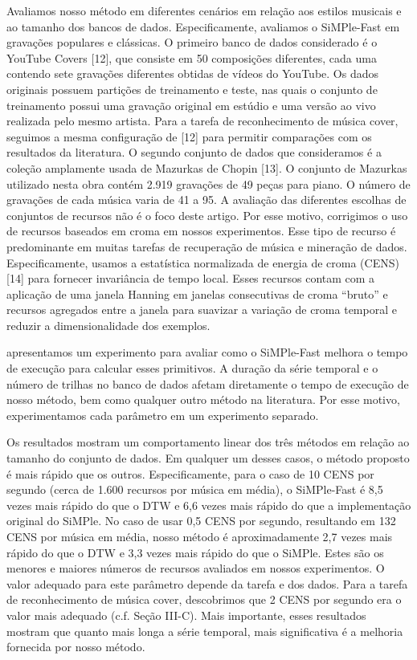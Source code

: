 \documentclass{article}
\begin{document}
Avaliamos nosso método em diferentes cenários em relação aos estilos musicais e ao tamanho dos bancos de dados. Especificamente, avaliamos o SiMPle-Fast em gravações populares e clássicas. O primeiro banco de dados considerado é o YouTube Covers [12], que consiste em 50 composições diferentes, cada uma contendo sete gravações diferentes obtidas de vídeos do YouTube. Os dados originais possuem partições de treinamento e teste, nas quais o conjunto de treinamento possui uma gravação original em estúdio e uma versão ao vivo realizada pelo mesmo artista. Para a tarefa de reconhecimento de música cover, seguimos a mesma configuração de [12] para permitir comparações com os resultados da literatura. O segundo conjunto de dados que consideramos é a coleção amplamente usada de Mazurkas de Chopin [13]. O conjunto de Mazurkas utilizado nesta obra contém 2.919 gravações de 49 peças para piano. O número de gravações de cada música varia de 41 a 95. A avaliação das diferentes escolhas de conjuntos de recursos não é o foco deste artigo. Por esse motivo, corrigimos o uso de recursos baseados em croma em nossos experimentos. Esse tipo de recurso é predominante em muitas tarefas de recuperação de música e mineração de dados. Especificamente, usamos a estatística normalizada de energia de croma (CENS) [14] para fornecer invariância de tempo local. Esses recursos contam com a aplicação de uma janela Hanning em janelas consecutivas de croma “bruto” e recursos agregados entre a janela para suavizar a variação de croma temporal e reduzir a dimensionalidade dos exemplos.

apresentamos um experimento para avaliar como o SiMPle-Fast melhora o tempo de execução para calcular esses primitivos. A duração da série temporal e o número de trilhas no banco de dados afetam diretamente o tempo de execução de nosso método, bem como qualquer outro método na literatura. Por esse motivo, experimentamos cada parâmetro em um experimento separado.

Os resultados mostram um comportamento linear dos três métodos em relação ao tamanho do conjunto de dados. Em qualquer um desses casos, o método proposto é mais rápido que os outros. Especificamente, para o caso de 10 CENS por segundo (cerca de 1.600 recursos por música em média), o SiMPle-Fast é 8,5 vezes mais rápido do que o DTW e 6,6 vezes mais rápido do que a implementação original do SiMPle. No caso de usar 0,5 CENS por segundo, resultando em 132 CENS por música em média, nosso método é aproximadamente 2,7 vezes mais rápido do que o DTW e 3,3 vezes mais rápido do que o SiMPle. Estes são os menores e maiores números de recursos avaliados em nossos experimentos. O valor adequado para este parâmetro depende da tarefa e dos dados. Para a tarefa de reconhecimento de música cover, descobrimos que 2 CENS por segundo era o valor mais adequado (c.f. Seção III-C).
Mais importante, esses resultados mostram que quanto mais longa a série temporal, mais significativa é a melhoria fornecida por nosso método.
\end{document}
